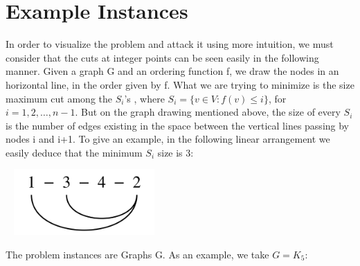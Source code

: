 \section{Example Instances}


In order to visualize the problem and attack it using more intuition, we must consider that the cuts at integer points can 
be seen easily in the following manner. Given a graph G and an ordering function f, we draw the nodes in an horizontal line, in the order given by f. What we are trying to minimize is the size maximum cut among the $S_i$'s , where $S_i=\{v \in V : f(v) \leq i\}$, for $i=1,2,\ldots,n-1$. But on the graph drawing mentioned above, the size of every $S_i$ is the number of edges existing in the space between the vertical lines passing by nodes i and i+1. To give an example, in the following linear
arrangement we easily deduce that the minimum $S_i$ size is 3:


\begin{center}
\includegraphics[height=2.5cm,width=6cm]{img/graph2.png}
\end{center}


The problem instances are Graphs G. As an example, we take $G=K_5$:


